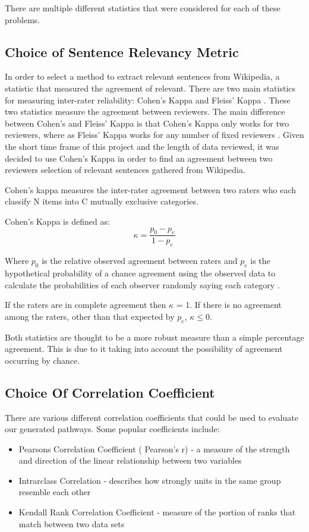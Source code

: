 \documentclass[bsc,frontabs,twoside,singlespacing,parskip,deptreport]{infthesis}     %
\begin{document}
There are multiple different statistics that were considered for each of these problems.
\subsection{Choice of Sentence Relevancy Metric}\label{sec:cohen}
In order to select a method to extract relevant sentences from Wikipedia, a statistic that measured the agreement
of relevant. There are two main statistics for measuring inter-rater reliability: Cohen's Kappa and Fleiss' Kappa \cite{}.
These two statistics measure the agreement between reviewers. The main difference between Cohen's and Fleiss' Kappa is that
Cohen's Kappa only works for two reviewers, where as Fleiss' Kappa works for any number of fixed reviewers \cite{}.
Given the short time frame of this project and the length of data reviewed, it was decided to use Cohen's Kappa in order
to find an agreement between two reviewers selection of relevant sentences gathered from Wikipedia.

Cohen's kappa measures the inter-rater agreement between two raters
who each classify N items into C mutually exclusive categories.

Cohen's Kappa is defined as:\\
\begin{equation}
  \kappa = \frac{p_{0} - p_{e}}{1 - p_{e}}\nonumber
\end{equation}

Where $p_0$ is the relative observed agreement between raters and $p_e$ is the hypothetical probability
of a chance agreement using the observed data to calculate the probabilities of each observer randomly saying each category \cite{}.

If the raters are in complete agreement then $\kappa$ = 1.
If there is no agreement among the raters, other than that expected by $p_e$, $\kappa \leq 0$.

Both statistics are thought to be a more robust measure than a simple percentage agreement.
This is due to it taking into account the possibility of agreement occurring by chance.

\subsection{Choice Of Correlation Coefficient}\label{sec:kendall}

There are various different correlation coefficients that could be used to evaluate our generated pathways.
Some popular coefficients include:
\begin{itemize}
\item Pearsons Correlation Coefficient ( Pearson's r) - a measure of the strength and direction of the linear relationship between two variables
\item Intrarclass Correlation - describes how strongly units in the same group resemble each other
\item Kendall Rank Correlation Coefficient -  measure of the portion of ranks that match between two data sets
\end{itemize}
\end{document}
